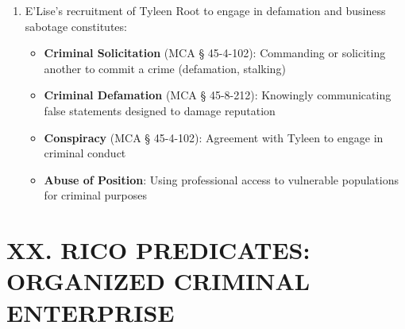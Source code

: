\documentclass[12pt,letterpaper]{article}
\begin{document}
\begin{enumerate}
\textbf{G. Criminal Liability}

\item E'Lise's recruitment of Tyleen Root to engage in defamation and business sabotage constitutes:

\begin{itemize}
\item \textbf{Criminal Solicitation} (MCA § 45-4-102): Commanding or soliciting another to commit a crime (defamation, stalking)
\item \textbf{Criminal Defamation} (MCA § 45-8-212): Knowingly communicating false statements designed to damage reputation
\item \textbf{Conspiracy} (MCA § 45-4-102): Agreement with Tyleen to engage in criminal conduct
\item \textbf{Abuse of Position}: Using professional access to vulnerable populations for criminal purposes
\end{itemize}

\end{enumerate}

\section*{XX. RICO PREDICATES: ORGANIZED CRIMINAL ENTERPRISE}
\end{document}

